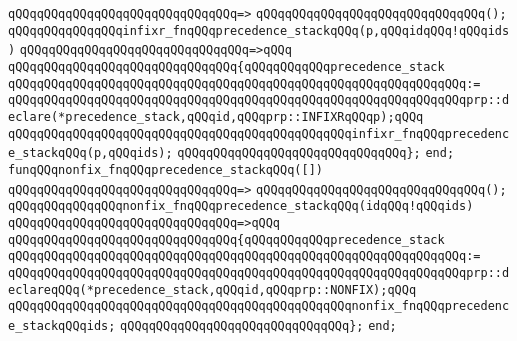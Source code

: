 \verb|qQQqqQQqqQQqqQQqqQQqqQQqqQQqqQQq=>|\newline
\verb|qQQqqQQqqQQqqQQqqQQqqQQqqQQqqQQq();|\newline
\newline
\verb|qQQqqQQqqQQqqQQqinfixr_fnqQQqprecedence_stackqQQq(p,qQQqidqQQq!qQQqids)|\newline
\verb|qQQqqQQqqQQqqQQqqQQqqQQqqQQqqQQq=>qQQq|\newline
\verb|qQQqqQQqqQQqqQQqqQQqqQQqqQQqqQQq{qQQqqQQqqQQqprecedence_stack|\newline
\verb|qQQqqQQqqQQqqQQqqQQqqQQqqQQqqQQqqQQqqQQqqQQqqQQqqQQqqQQqqQQqqQQq:=|\newline
\verb|qQQqqQQqqQQqqQQqqQQqqQQqqQQqqQQqqQQqqQQqqQQqqQQqqQQqqQQqqQQqqQQqprp::declare(*precedence_stack,qQQqid,qQQqprp::INFIXRqQQqp);qQQq|\newline
\newline
\verb|qQQqqQQqqQQqqQQqqQQqqQQqqQQqqQQqqQQqqQQqqQQqqQQqinfixr_fnqQQqprecedence_stackqQQq(p,qQQqids);|\newline
\verb|qQQqqQQqqQQqqQQqqQQqqQQqqQQqqQQq};|\newline
\verb|end;|\newline
\newline
\verb|funqQQqnonfix_fnqQQqprecedence_stackqQQq([])|\newline
\verb|qQQqqQQqqQQqqQQqqQQqqQQqqQQqqQQq=>|\newline
\verb|qQQqqQQqqQQqqQQqqQQqqQQqqQQqqQQq();|\newline
\newline
\verb|qQQqqQQqqQQqqQQqnonfix_fnqQQqprecedence_stackqQQq(idqQQq!qQQqids)|\newline
\verb|qQQqqQQqqQQqqQQqqQQqqQQqqQQqqQQq=>qQQq|\newline
\verb|qQQqqQQqqQQqqQQqqQQqqQQqqQQqqQQq{qQQqqQQqqQQqprecedence_stack|\newline
\verb|qQQqqQQqqQQqqQQqqQQqqQQqqQQqqQQqqQQqqQQqqQQqqQQqqQQqqQQqqQQqqQQq:=|\newline
\verb|qQQqqQQqqQQqqQQqqQQqqQQqqQQqqQQqqQQqqQQqqQQqqQQqqQQqqQQqqQQqqQQqprp::declareqQQq(*precedence_stack,qQQqid,qQQqprp::NONFIX);qQQq|\newline
\newline
\verb|qQQqqQQqqQQqqQQqqQQqqQQqqQQqqQQqqQQqqQQqqQQqqQQqnonfix_fnqQQqprecedence_stackqQQqids;|\newline
\verb|qQQqqQQqqQQqqQQqqQQqqQQqqQQqqQQq};|\newline
\verb|end;|\newline
\newline
